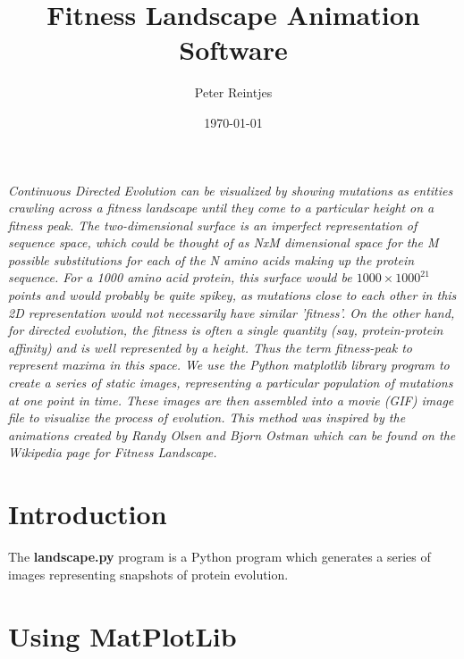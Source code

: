 \documentclass[10pt,letterpaper]{article}
\date{}
\begin{document}
\title{Fitness Landscape Animation Software}
\author{Peter Reintjes}
\date{\today}
\maketitle

\vspace*{0.2in}
\begin{flushleft}
\texttt{[image: \{fitness]}.png}
\end{flushleft}

{\it Continuous Directed Evolution can be visualized by showing mutations as entities crawling across a fitness landscape until they come to a particular height on a fitness peak.  The two-dimensional surface is an imperfect representation of sequence space, which could be thought of as NxM dimensional space for the M possible substitutions for each of the N amino acids making up the protein sequence.  For a 1000 amino acid protein, this surface would be $1000 \times 1000^21$ points and would probably be quite spikey, as mutations close to each other in this 2D representation would not necessarily have similar 'fitness'.  On the other hand, for directed evolution, the fitness is often a single quantity (say, protein-protein affinity) and is well represented by a height.  Thus the term fitness-peak to represent maxima in this space.  We use the Python matplotlib library\cite{matplotlib} program to create a series of static images, representing a particular population of mutations at one point in time.  These images are then assembled into a movie (GIF) image file to visualize the process of evolution.  This method was inspired by the animations created by Randy Olsen and Bjorn Ostman which can be found on the Wikipedia page for Fitness Landscape\cite{fitness}.}

\section*{Introduction}

The {\bf landscape.py} program is a Python program which generates a series of images representing snapshots of protein evolution.

\section*{Using MatPlotLib}
\end{document}
